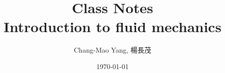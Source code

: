 \documentclass[12pt]{article}
\begin{document}
\title{Class Notes\\ Introduction to fluid mechanics}
\author{Chang-Mao Yang, 楊長茂}
\date{\today}

\maketitle

\tableofcontents
\newpage






\end{document}
